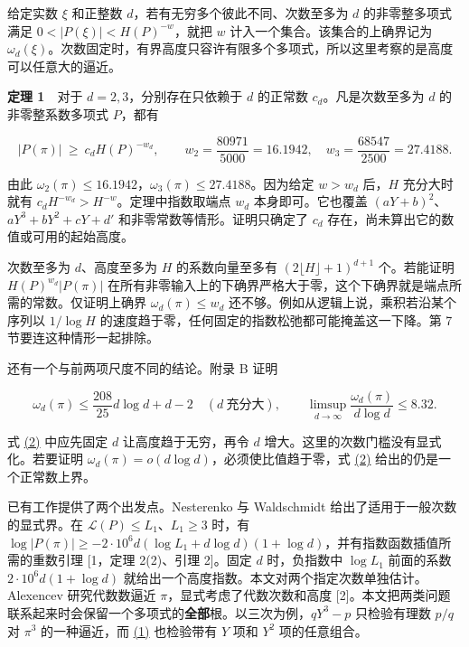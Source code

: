 \documentclass[11pt,a4paper]{article}
\begin{document}
给定实数 \(\xi\) 和正整数 \(d\)，若有无穷多个彼此不同、次数至多为 \(d\) 的非零整多项式满足 \(0<|P(\xi)|<H(P)^{-w}\)，就把 \(w\) 计入一个集合。该集合的上确界记为 \(\omega_d(\xi)\)。次数固定时，有界高度只容许有限多个多项式，所以这里考察的是高度可以任意大的逼近。

\textbf{定理 1}　对于 \(d=2,3\)，分别存在只依赖于 \(d\) 的正常数 \(c_d\)。凡是次数至多为 \(d\) 的非零整系数多项式 \(P\)，都有

\[
 |P(\pi)|\ \ge\ c_d H(P)^{-w_d},\qquad
 w_2=\frac{80971}{5000}=16.1942,\quad
 w_3=\frac{68547}{2500}=27.4188.                                      \tag{1}\label{eq:1}
\]

由此 \(\omega_2(\pi)\le16.1942\)，\(\omega_3(\pi)\le27.4188\)。因为给定 \(w>w_d\) 后，\(H\) 充分大时就有 \(c_dH^{-w_d}>H^{-w}\)。定理中指数取端点 \(w_d\) 本身即可。它也覆盖 \((aY+b)^2\)、\(aY^3+bY^2+cY+d'\) 和非零常数等情形。证明只确定了 \(c_d\) 存在，尚未算出它的数值或可用的起始高度。

次数至多为 \(d\)、高度至多为 \(H\) 的系数向量至多有 \((2\lfloor H\rfloor+1)^{d+1}\) 个。若能证明 \(H(P)^{w_d}|P(\pi)|\) 在所有非零输入上的下确界严格大于零，这个下确界就是端点所需的常数。仅证明上确界 \(\omega_d(\pi)\le w_d\) 还不够。例如从逻辑上说，乘积若沿某个序列以 \(1/\log H\) 的速度趋于零，任何固定的指数松弛都可能掩盖这一下降。第 7 节要连这种情形一起排除。

还有一个与前两项尺度不同的结论。附录 B 证明

\[
 \omega_d(\pi)\le \frac{208}{25}d\log d+d-2\quad(d\ \text{充分大}),\qquad
 \limsup_{d\to\infty}\frac{\omega_d(\pi)}{d\log d}\le 8.32.              \tag{2}\label{eq:2}
\]

式 \hyperref[eq:2]{(2)} 中应先固定 \(d\) 让高度趋于无穷，再令 \(d\) 增大。这里的次数门槛没有显式化。若要证明 \(\omega_d(\pi)=o(d\log d)\)，必须使比值趋于零，式 \hyperref[eq:2]{(2)} 给出的仍是一个正常数上界。

已有工作提供了两个出发点。Nesterenko 与 Waldschmidt 给出了适用于一般次数的显式界。在 \(\mathcal L(P)\le L_1\)、\(L_1\ge3\) 时，有 \(\log|P(\pi)|\ge-2\cdot10^6d(\log L_1+d\log d)(1+\log d)\)，并有指数函数插值所需的重数引理 {[}1，定理 2(2)、引理 2{]}。固定 \(d\) 时，负指数中 \(\log L_1\) 前面的系数 \(2\cdot10^6d(1+\log d)\) 就给出一个高度指数。本文对两个指定次数单独估计。Alexencev 研究代数数逼近 \(\pi\)，显式考虑了代数次数和高度 {[}2{]}。本文把两类问题联系起来时会保留一个多项式的\textbf{全部}根。以三次为例，\(qY^3-p\) 只检验有理数 \(p/q\) 对 \(\pi^3\) 的一种逼近，而 \hyperref[eq:1]{(1)} 也检验带有 \(Y\) 项和 \(Y^2\) 项的任意组合。
\end{document}
